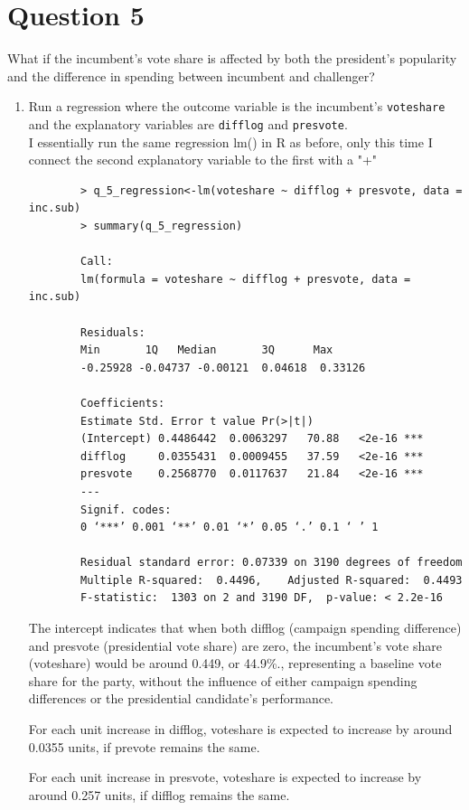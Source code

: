\documentclass[12pt,letterpaper]{article}
\begin{document}
	\newpage	

\section*{Question 5}
\noindent What if the incumbent's vote share is affected by both the president's popularity and the difference in spending between incumbent and challenger? 
	\begin{enumerate}
		\item Run a regression where the outcome variable is the incumbent's \texttt{voteshare} and the explanatory variables are \texttt{difflog} and \texttt{presvote}.	\\
		
		I essentially run the same regression lm() in R as before, only this time I connect the second explanatory variable to the first with a "+"
		\begin{verbatim}
		> q_5_regression<-lm(voteshare ~ difflog + presvote, data = inc.sub)
		> summary(q_5_regression)
		
		Call:
		lm(formula = voteshare ~ difflog + presvote, data = inc.sub)
		
		Residuals:
		Min       1Q   Median       3Q      Max 
		-0.25928 -0.04737 -0.00121  0.04618  0.33126 
		
		Coefficients:
		Estimate Std. Error t value Pr(>|t|)    
		(Intercept) 0.4486442  0.0063297   70.88   <2e-16 ***
		difflog     0.0355431  0.0009455   37.59   <2e-16 ***
		presvote    0.2568770  0.0117637   21.84   <2e-16 ***
		---
		Signif. codes:  
		0 ‘***’ 0.001 ‘**’ 0.01 ‘*’ 0.05 ‘.’ 0.1 ‘ ’ 1
		
		Residual standard error: 0.07339 on 3190 degrees of freedom
		Multiple R-squared:  0.4496,	Adjusted R-squared:  0.4493 
		F-statistic:  1303 on 2 and 3190 DF,  p-value: < 2.2e-16
	\end{verbatim}
	
	The intercept indicates that when both difflog (campaign spending difference) and presvote (presidential vote share) are zero, the incumbent’s vote share (voteshare) would be around 0.449, or 44.9\%., representing a baseline vote share for the party, without the influence of either campaign spending differences or the presidential candidate’s performance.
	
	For each unit increase in difflog, voteshare is expected to increase by around 0.0355 units, if prevote remains the same. 
	
	For each unit increase in presvote, voteshare is expected to increase by around 0.257 units, if difflog remains the same.
	

\end{enumerate}
\end{document}

